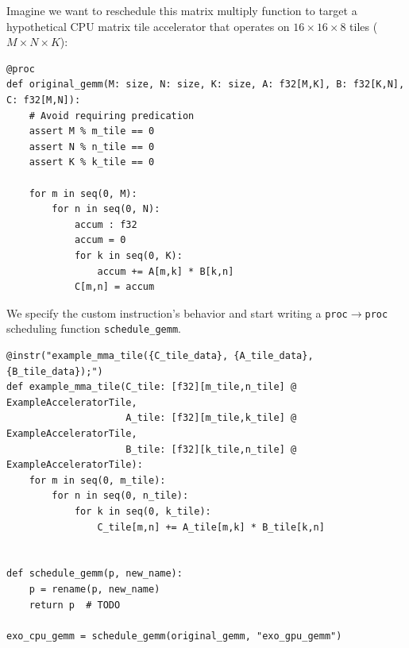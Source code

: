 \begin{minipage}[t]{0.5\textwidth}\codeminipage
Imagine we want to reschedule this matrix multiply function to target a hypothetical CPU matrix tile accelerator that operates on $16 \times 16 \times 8$ tiles ($M \times N \times K$):
\vspace{6mm}
\tiny
\begin{verbatim}
@proc
def original_gemm(M: size, N: size, K: size, A: f32[M,K], B: f32[K,N], C: f32[M,N]):
    # Avoid requiring predication
    assert M % m_tile == 0
    assert N % n_tile == 0
    assert K % k_tile == 0

    for m in seq(0, M):
        for n in seq(0, N):
            accum : f32
            accum = 0
            for k in seq(0, K):
                accum += A[m,k] * B[k,n]
            C[m,n] = accum
\end{verbatim}
\end{minipage}
\begin{minipage}[t]{0.5\textwidth}\fixminipage
\vspace{3cm}
We specify the custom instruction's behavior and start writing a \texttt{proc}$\to$\texttt{proc} scheduling function \texttt{schedule\_gemm}.
\vspace{6mm}
\tiny
\begin{verbatim}
@instr("example_mma_tile({C_tile_data}, {A_tile_data}, {B_tile_data});")
def example_mma_tile(C_tile: [f32][m_tile,n_tile] @ ExampleAcceleratorTile,
                     A_tile: [f32][m_tile,k_tile] @ ExampleAcceleratorTile,
                     B_tile: [f32][k_tile,n_tile] @ ExampleAcceleratorTile):
    for m in seq(0, m_tile):
        for n in seq(0, n_tile):
            for k in seq(0, k_tile):
                C_tile[m,n] += A_tile[m,k] * B_tile[k,n]


def schedule_gemm(p, new_name):
    p = rename(p, new_name)
    return p  # TODO

exo_cpu_gemm = schedule_gemm(original_gemm, "exo_gpu_gemm")
\end{verbatim}
\end{minipage}
\newpage
{}

